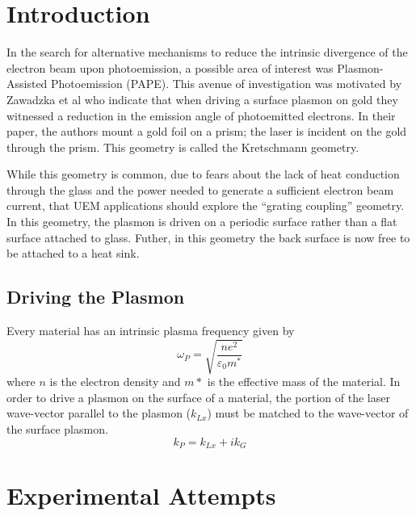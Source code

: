 
\section{Introduction}

In the search for alternative mechanisms to reduce the intrinsic divergence of the electron beam upon photoemission, a possible area of interest was Plasmon-Assisted Photoemission (PAPE). 
This avenue of investigation was motivated by Zawadzka et al \cite{zawadzka_evanescent_2001} who indicate that when driving a surface plasmon on gold they witnessed a reduction in the emission angle of photoemitted electrons.
In their paper, the authors mount a gold foil on a prism; the laser is incident on the gold through the prism.
This geometry is called the Kretschmann geometry.

While this geometry is common, due to fears about the lack of heat conduction through the glass and the power needed to generate a sufficient electron beam current, that UEM applications should explore the ``grating coupling'' geometry.
In this geometry, the plasmon is driven on a periodic surface rather than a flat surface attached to glass.
Futher, in this geometry the back surface is now free to be attached to a heat sink.

\subsection{Driving the Plasmon}

Every material has an intrinsic plasma frequency given by 
\begin{equation}
  \omega_{P} = \sqrt{\frac{n e^2}{\varepsilon_{0} m^*}}
\end{equation}
where $n$ is the electron density and $m*$ is the effective mass of the material.
In order to drive a plasmon on the surface of a material, the portion of the laser wave-vector parallel to the plasmon ($k_{Lx}$) must be matched to the wave-vector of the surface plasmon.
\begin{equation}
  k_{P} = k_{Lx} + i k_{G}
\end{equation}


\section{Experimental Attempts}

